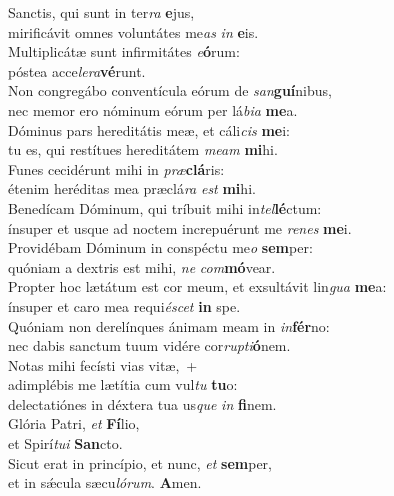 \evenverse Sanctis, qui sunt in ter\textit{ra} \textbf{e}jus,~\*\\
\evenverse mirificávit omnes voluntátes me\textit{as} \textit{in} \textbf{e}is.\\
\oddverse Multiplicátæ sunt infirmitátes \textit{e}\textbf{ó}rum:~\*\\
\oddverse póstea acce\textit{le}\textit{ra}\textbf{vé}runt.\\
\evenverse Non congregábo conventícula eórum de \textit{san}\textbf{guí}nibus,~\*\\
\evenverse nec memor ero nóminum eórum per lá\textit{bi}\textit{a} \textbf{me}a.\\
\oddverse Dóminus pars hereditátis meæ, et cáli\textit{cis} \textbf{me}i:~\*\\
\oddverse tu es, qui restítues hereditátem \textit{me}\textit{am} \textbf{mi}hi.\\
\evenverse Funes cecidérunt mihi in \textit{præ}\textbf{clá}ris:~\*\\
\evenverse étenim heréditas mea præclá\textit{ra} \textit{est} \textbf{mi}hi.\\
\oddverse Benedícam Dóminum, qui tríbuit mihi in\textit{tel}\textbf{lé}ctum:~\*\\
\oddverse ínsuper et usque ad noctem increpuérunt me \textit{re}\textit{nes} \textbf{me}i.\\
\evenverse Providébam Dóminum in conspéctu me\textit{o} \textbf{sem}per:~\*\\
\evenverse quóniam a dextris est mihi, \textit{ne} \textit{com}\textbf{mó}vear.\\
\oddverse Propter hoc lætátum est cor meum, et exsultávit lin\textit{gua} \textbf{me}a:~\*\\
\oddverse ínsuper et caro mea requi\textit{é}\textit{scet} \textbf{in} spe.\\
\evenverse Quóniam non derelínques ánimam meam in \textit{in}\textbf{fér}no:~\*\\
\evenverse nec dabis sanctum tuum vidére cor\textit{rup}\textit{ti}\textbf{ó}nem.\\
\oddverse Notas mihi fecísti vias vitæ,~+\\
\oddverse  adimplébis me lætítia cum vul\textit{tu} \textbf{tu}o:~\*\\
\oddverse delectatiónes in déxtera tua us\textit{que} \textit{in} \textbf{fi}nem.\\
\evenverse Glória Patri, \textit{et} \textbf{Fí}lio,~\*\\
\evenverse et Spirí\textit{tu}\textit{i} \textbf{San}cto.\\
\oddverse Sicut erat in princípio, et nunc, \textit{et} \textbf{sem}per,~\*\\
\oddverse et in sǽcula sæcu\textit{ló}\textit{rum}. \textbf{A}men.\\
